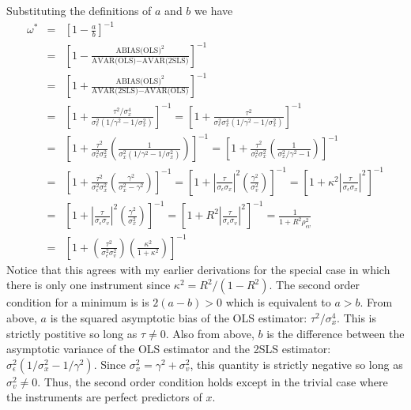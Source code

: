 \documentclass[12pt]{article}
\theoremstyle{definition}
\begin{document}
  Substituting the definitions of $a$ and $b$ we have
    \begin{eqnarray*}
      \omega^* &=& \left[ 1 - \frac{a}{b}\right]^{-1}\\
      &=&\left[1 - \frac{\mbox{ABIAS(OLS)}^2}{\mbox{AVAR(OLS)}- \mbox{AVAR(2SLS)}} \right]^{-1}\\
      &=&\left[1 + \frac{\mbox{ABIAS(OLS)}^2}{\mbox{AVAR(2SLS)}-\mbox{AVAR(OLS)}} \right]^{-1}\\
      &=& \left[1 + \frac{\tau^2/\sigma_x^4}{\sigma_\epsilon^2(1/\gamma^2 - 1/\sigma_x^2)}\right]^{-1}
      = \left[1 + \frac{\tau^2}{\sigma_\epsilon^2 \sigma_x^4 (1/\gamma^2 - 1/\sigma_x^2)}\right]^{-1}\\
      &=& \left[1 + \frac{\tau^2}{\sigma_\epsilon^2 \sigma_x^2}\left( \frac{1}{\sigma_x^2(1/\gamma^2 - 1/\sigma_x^2)}\right)\right]^{-1}
      = \left[1 + \frac{\tau^2}{\sigma_\epsilon^2 \sigma_x^2}\left( \frac{1}{\sigma_x^2/\gamma^2 - 1}\right)\right]^{-1}\\
      &=& \left[1 + \frac{\tau^2}{\sigma_\epsilon^2 \sigma_x^2}\left( \frac{\gamma^2}{\sigma_x^2 - \gamma^2}\right)\right]^{-1}
      = \left[1 + \left|\frac{\tau}{\sigma_\epsilon \sigma_x}\right|^2\left( \frac{\gamma^2}{\sigma_v^2}\right)\right]^{-1}
      = \left[1 +\kappa^2 \left|\frac{\tau}{\sigma_\epsilon \sigma_x}\right|^2\right]^{-1}\\
      &=& \left[1 + \left|\frac{\tau}{\sigma_\epsilon \sigma_v}\right|^2\left( \frac{\gamma^2}{\sigma_x^2}\right)\right]^{-1}
      = \left[1 + R^2 \left|\frac{\tau}{\sigma_\epsilon \sigma_v}\right|^2\right]^{-1} = \frac{1}{1 + R^2 \rho_{\epsilon v}^2}\\
      &=& \left[1 + \left(\frac{\tau^2}{\sigma_\epsilon^2 \sigma_v^2}\right)\left( \frac{\kappa^2}{1 + \kappa^2}\right)\right]^{-1}
    \end{eqnarray*}
    Notice that this agrees with my earlier derivations for the special case in which there is only one instrument since $\kappa^2 = R^2/(1 - R^2)$. The second order condition for a minimum is is $2(a-b) > 0$ which is equivalent to $a > b$. From above, $a$ is the squared asymptotic bias of the OLS estimator: $\tau^2/\sigma_x^4$. This is strictly postitive so long as $\tau \neq 0$. Also from above, $b$ is the difference between the asymptotic variance of the OLS estimator and the 2SLS estimator: $\sigma_\epsilon^2(1/\sigma_x^2 - 1/\gamma^2)$. Since $\sigma_x^2 = \gamma^2 + \sigma_v^2$, this quantity is strictly negative so long as $\sigma_v^2 \neq 0$. Thus, the second order condition holds except in the trivial case where the instruments are perfect predictors of $x$.
\end{document}
